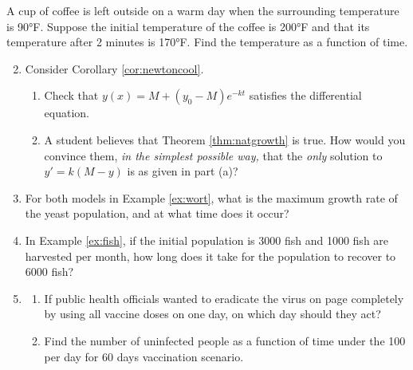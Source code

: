 \begin{exercises}
\exstart A cup of coffee is left outside on a warm day when the surrounding temperature is \ang{90}F. Suppose the initial temperature of the coffee is \ang{200}F and that its temperature after 2 minutes is \ang{170}F. Find the temperature as a function of time.

\begin{enumerate}\setcounter{enumi}{1}
  \item Consider Corollary \ref{cor:newtoncool}.
	\begin{enumerate}
	  \item Check that $y(x)=M+(y_0-M)e^{-kt}$ satisfies the differential equation.
	  \item A student believes that Theorem \ref{thm:natgrowth} is true. How would you convince them, \emph{in the simplest possible way,} that the \emph{only} solution to $y'=k(M-y)$ is as given in part (a)?
	\end{enumerate}

	
	\item For both models in Example \ref{ex:wort}, what is the maximum growth rate of the yeast population, and at what time does it occur?
	

	\item In Example \ref{ex:fish}, if the initial population is 3000 fish and 1000 fish are harvested per month, how long does it take for the population to recover to 6000 fish?
	
	\item\begin{enumerate}
	  \item If public health officials wanted to eradicate the virus on page \pageref{pg:virus} completely by using all vaccine doses on one day, on which day should they act?
	  \item Find the number of uninfected people as a function of time under the 100 per day for 60 days vaccination scenario.
	\end{enumerate}
\end{enumerate}
\end{exercises}
